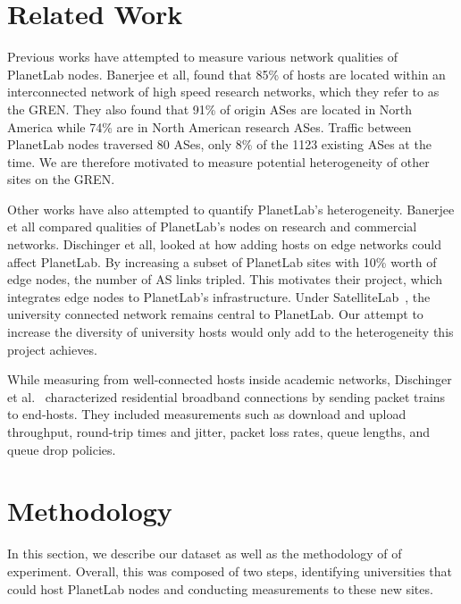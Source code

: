 \documentclass{sig-alternate-10pt}
\begin{document}
\section{Related Work} 


Previous works have attempted to measure various network qualities of PlanetLab
nodes. Banerjee et all, found that 85\% of hosts are located within an
interconnected network of high speed research networks, which they refer to as
the GREN. They also found that 91\% of origin ASes are located in North America
while 74\% are in North American research ASes. Traffic between PlanetLab nodes
traversed 80 ASes, only 8\% of the 1123 existing ASes at the time. We are therefore
motivated to measure potential heterogeneity of other sites on the GREN.

Other works have also attempted to quantify PlanetLab’s heterogeneity. Banerjee
et all compared qualities of PlanetLab’s nodes on research and commercial
networks. Dischinger et all, looked at how adding hosts on edge networks could
affect PlanetLab. By increasing a subset of PlanetLab sites with 10\% worth of
edge nodes, the number of AS links tripled. This motivates their project, which
integrates edge nodes to PlanetLab’s infrastructure. Under
SatelliteLab~\cite{dischinger:satellitelab}, the university connected network
remains central to PlanetLab.  Our attempt to increase the diversity of
university hosts would only add to the heterogeneity this project achieves.

While measuring from well-connected hosts inside academic networks, Dischinger
et al.~\cite{dischinger:residential} characterized residential broadband
connections by sending packet trains to end-hosts. They included measurements
such as download and upload throughput, round-trip times and jitter, packet
loss rates, queue lengths, and queue drop policies. 



\section{Methodology}

In this section, we describe our dataset as well as the methodology of of
experiment.  Overall, this was composed of two steps, identifying universities
that could host PlanetLab nodes and conducting measurements to these new sites.
\end{document}
